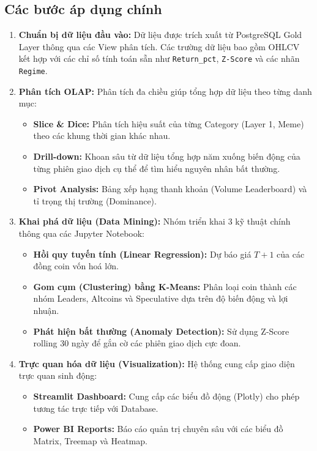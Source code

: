 \subsection{Các bước áp dụng chính}
\begin{enumerate}[label=\alph*)]

    \item \textbf{Chuẩn bị dữ liệu đầu vào:}  
    Dữ liệu được trích xuất từ PostgreSQL Gold Layer thông qua các View phân tích. Các trường dữ liệu bao gồm OHLCV kết hợp với các chỉ số tính toán sẵn như \texttt{Return\_pct}, \texttt{Z-Score} và các nhãn \texttt{Regime}.

    \item \textbf{Phân tích OLAP:}  
    Phân tích đa chiều giúp tổng hợp dữ liệu theo từng danh mục:
    \begin{itemize}
        \item \textbf{Slice \& Dice:} Phân tích hiệu suất của từng Category (Layer 1, Meme) theo các khung thời gian khác nhau.
        \item \textbf{Drill-down:} Khoan sâu từ dữ liệu tổng hợp năm xuống biến động của từng phiên giao dịch cụ thể để tìm hiểu nguyên nhân bất thường.
        \item \textbf{Pivot Analysis:} Bảng xếp hạng thanh khoản (Volume Leaderboard) và tỉ trọng thị trường (Dominance).
    \end{itemize}

    \item \textbf{Khai phá dữ liệu (Data Mining):}  
    Nhóm triển khai 3 kỹ thuật chính thông qua các Jupyter Notebook:
    \begin{itemize}
        \item \textbf{Hồi quy tuyến tính (Linear Regression):} Dự báo giá $T+1$ của các đồng coin vốn hoá lớn.
        \item \textbf{Gom cụm (Clustering) bằng K-Means:} Phân loại coin thành các nhóm Leaders, Altcoins và Speculative dựa trên độ biến động và lợi nhuận.
        \item \textbf{Phát hiện bất thường (Anomaly Detection):} Sử dụng Z-Score rolling 30 ngày để gắn cờ các phiên giao dịch cực đoan.
    \end{itemize}

    \item \textbf{Trực quan hóa dữ liệu (Visualization):}  
    Hệ thống cung cấp giao diện trực quan sinh động:
    \begin{itemize}
        \item \textbf{Streamlit Dashboard:} Cung cấp các biểu đồ động (Plotly) cho phép tương tác trực tiếp với Database.
        \item \textbf{Power BI Reports:} Báo cáo quản trị chuyên sâu với các biểu đồ Matrix, Treemap và Heatmap.
    \end{itemize}
\end{enumerate}

